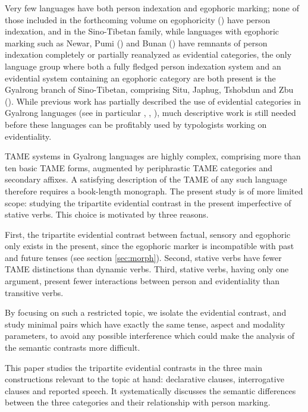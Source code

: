 \documentclass[11pt]{article}
\begin{document}
Very few languages have both person indexation and egophoric marking; none of those included in the forthcoming volume on egophoricity (\citealt{norcliffe17egophoricity}) have person indexation, and in the Sino-Tibetan family, while languages with egophoric marking such as Newar, Pumi (\citealt{daudey14volition}) and Bunan (\citealt{widmer17epistemization}) have remnants of person indexation completely or partially reanalyzed as evidential categories, the only language group where both a fully fledged person indexation system and an evidential system containing an egophoric category are both present is the Gyalrong branch of Sino-Tibetan, comprising Situ, Japhug, Tshobdun and Zbu (\citealt{sun18evidentials}). While previous work has partially described the use of evidential categories in Gyalrong languages (see in particular \citealt{youjing03zhuokeji}, \citealt{jackson03caodeng}, \citealt[617-620]{jacques17sketch}), much descriptive work is still needed before these languages can be profitably used by typologists working on evidentiality.

TAME systems in Gyalrong languages are highly complex, comprising more than ten basic TAME forms, augmented by periphrastic TAME categories and secondary affixes. A satisfying description of the TAME of any such language therefore requires a book-length monograph. The present study is of more limited scope: studying the tripartite evidential contrast in the present imperfective of stative verbs. This choice is motivated by three reasons.

First, the tripartite evidential contrast between factual, sensory and egophoric only exists in the present, since the egophoric marker is incompatible with past and future tenses (see section \ref{sec:morph}). Second, stative verbs have fewer TAME distinctions than dynamic verbs. Third, stative verbs, having only one argument, present fewer interactions between person and evidentiality than transitive verbs.

By focusing on such a restricted topic, we isolate the evidential contrast, and study minimal pairs which have exactly the same tense, aspect and modality parameters, to avoid any possible interference which could make the analysis of the semantic contrasts more difficult.

This paper studies the tripartite evidential contrasts in the three main constructions relevant to the topic at hand: declarative clauses, interrogative clauses and reported speech. It systematically discusses the semantic differences between the three categories and their relationship with person marking. %
\end{document}
